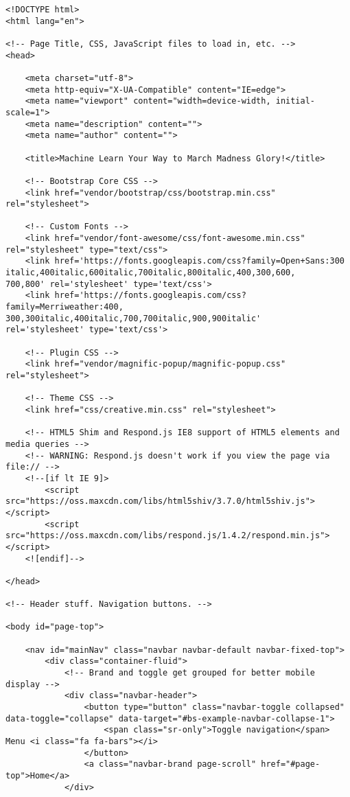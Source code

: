 \documentclass[onecolumn, draftclsnofoot,10pt, compsoc]{IEEEtran}
\begin{document}
\begin{lstlisting}[caption={MachineLearnYourWayToMarchMadnessGlory.html. The graphical user interface that provides users information on how to engage with the module, a link to the module, and information about our project.}]
<!DOCTYPE html>
<html lang="en">

<!-- Page Title, CSS, JavaScript files to load in, etc. -->
<head>

    <meta charset="utf-8">
    <meta http-equiv="X-UA-Compatible" content="IE=edge">
    <meta name="viewport" content="width=device-width, initial-scale=1">
    <meta name="description" content="">
    <meta name="author" content="">

    <title>Machine Learn Your Way to March Madness Glory!</title>

    <!-- Bootstrap Core CSS -->
    <link href="vendor/bootstrap/css/bootstrap.min.css" rel="stylesheet">

    <!-- Custom Fonts -->
    <link href="vendor/font-awesome/css/font-awesome.min.css" rel="stylesheet" type="text/css">
    <link href='https://fonts.googleapis.com/css?family=Open+Sans:300
italic,400italic,600italic,700italic,800italic,400,300,600,
700,800' rel='stylesheet' type='text/css'>
    <link href='https://fonts.googleapis.com/css?family=Merriweather:400,
300,300italic,400italic,700,700italic,900,900italic' 
rel='stylesheet' type='text/css'>

    <!-- Plugin CSS -->
    <link href="vendor/magnific-popup/magnific-popup.css" rel="stylesheet">

    <!-- Theme CSS -->
    <link href="css/creative.min.css" rel="stylesheet">

    <!-- HTML5 Shim and Respond.js IE8 support of HTML5 elements and media queries -->
    <!-- WARNING: Respond.js doesn't work if you view the page via file:// -->
    <!--[if lt IE 9]>
        <script src="https://oss.maxcdn.com/libs/html5shiv/3.7.0/html5shiv.js"></script>
        <script src="https://oss.maxcdn.com/libs/respond.js/1.4.2/respond.min.js"></script>
    <![endif]-->

</head>

<!-- Header stuff. Navigation buttons. -->

<body id="page-top">

    <nav id="mainNav" class="navbar navbar-default navbar-fixed-top">
        <div class="container-fluid">
            <!-- Brand and toggle get grouped for better mobile display -->
            <div class="navbar-header">
                <button type="button" class="navbar-toggle collapsed" 
data-toggle="collapse" data-target="#bs-example-navbar-collapse-1">
                    <span class="sr-only">Toggle navigation</span> Menu <i class="fa fa-bars"></i>
                </button>
                <a class="navbar-brand page-scroll" href="#page-top">Home</a>
            </div>


\end{lstlisting}
\end{document}

